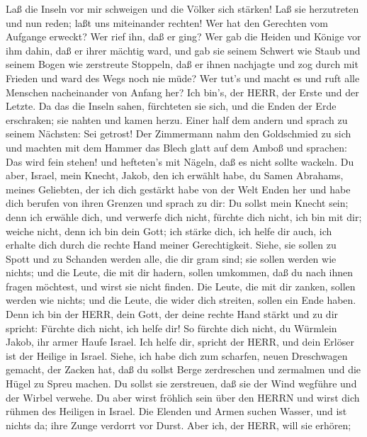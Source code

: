 Laß die Inseln vor mir schweigen und die Völker sich
stärken! Laß sie herzutreten und nun reden; laßt uns miteinander
rechten!  Wer hat den Gerechten vom Aufgange erweckt? Wer
rief ihn, daß er ging? Wer gab die Heiden und Könige vor ihm dahin, daß
er ihrer mächtig ward, und gab sie seinem Schwert wie Staub und seinem
Bogen wie zerstreute Stoppeln,  daß er ihnen nachjagte und
zog durch mit Frieden und ward des Wegs noch nie müde?  Wer
tut's und macht es und ruft alle Menschen nacheinander von Anfang her?
Ich bin's, der HERR, der Erste und der Letzte.  Da das die
Inseln sahen, fürchteten sie sich, und die Enden der Erde erschraken;
sie nahten und kamen herzu.  Einer half dem andern und
sprach zu seinem Nächsten: Sei getrost!  Der Zimmermann nahm
den Goldschmied zu sich und machten mit dem Hammer das Blech glatt auf
dem Amboß und sprachen: Das wird fein stehen! und hefteten's mit Nägeln,
daß es nicht sollte wackeln.  Du aber, Israel, mein Knecht,
Jakob, den ich erwählt habe, du Samen Abrahams, meines Geliebten,
 der ich dich gestärkt habe von der Welt Enden her und habe
dich berufen von ihren Grenzen und sprach zu dir: Du sollst mein Knecht
sein; denn ich erwähle dich, und verwerfe dich nicht, 
fürchte dich nicht, ich bin mit dir; weiche nicht, denn ich bin dein
Gott; ich stärke dich, ich helfe dir auch, ich erhalte dich durch die
rechte Hand meiner Gerechtigkeit.  Siehe, sie sollen zu
Spott und zu Schanden werden alle, die dir gram sind; sie sollen werden
wie nichts; und die Leute, die mit dir hadern, sollen umkommen,
 daß du nach ihnen fragen möchtest, und wirst sie nicht
finden. Die Leute, die mit dir zanken, sollen werden wie nichts; und die
Leute, die wider dich streiten, sollen ein Ende haben. 
Denn ich bin der HERR, dein Gott, der deine rechte Hand stärkt und zu
dir spricht: Fürchte dich nicht, ich helfe dir!  So fürchte
dich nicht, du Würmlein Jakob, ihr armer Haufe Israel. Ich helfe dir,
spricht der HERR, und dein Erlöser ist der Heilige in Israel.
 Siehe, ich habe dich zum scharfen, neuen Dreschwagen
gemacht, der Zacken hat, daß du sollst Berge zerdreschen und zermalmen
und die Hügel zu Spreu machen.  Du sollst sie zerstreuen,
daß sie der Wind wegführe und der Wirbel verwehe. Du aber wirst fröhlich
sein über den HERRN und wirst dich rühmen des Heiligen in Israel.
 Die Elenden und Armen suchen Wasser, und ist nichts da;
ihre Zunge verdorrt vor Durst. Aber ich, der HERR, will sie erhören;
